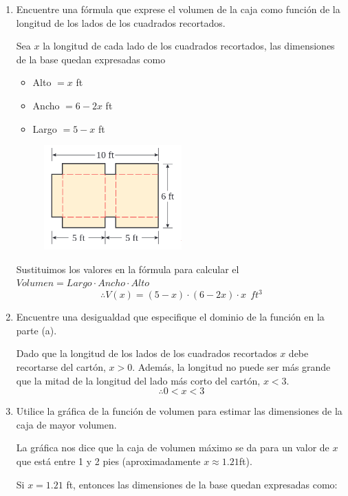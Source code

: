 \documentclass[12pt]{article}
\begin{document}
\begin{enumerate}[label=\alph*)]
\item Encuentre una fórmula que exprese el volumen de la caja como función de la longitud de los lados de los cuadrados recortados.

Sea $x$ la longitud de cada lado de los cuadrados recortados, las dimensiones de la base quedan expresadas como
\begin{itemize}
	\item Alto $=x$ ft
	\item Ancho $=6-2x$ ft
	\item Largo $=5-x$ ft
\end{itemize}

\begin{figure}[h]
	\centering
	\includegraphics[width=0.5\textwidth]{img/prob7.png}
\end{figure}

Sustituimos los valores en la fórmula para calcular el $Volumen = Largo \cdot Ancho \cdot Alto$
\[
\therefore V(x) = (5-x) \cdot (6-2x) \cdot x \ \  ft^3
\]

\item Encuentre una desigualdad que especifique el dominio de la función en la parte (a).

Dado que la longitud de los lados de los cuadrados recortados $x$ debe recortarse del cartón, $x > 0$. Además, la longitud no puede ser más grande que la mitad de la longitud del lado más corto del cartón, $x < 3$.
\[\therefore 0<x<3\]

\item Utilice la gráfica de la función de volumen para estimar las dimensiones de la caja de mayor volumen.

La gráfica nos dice que la caja de volumen máximo se da para un valor de $x$ que está entre 1 y 2 pies (aproximadamente $x \approx 1.21$ft).

Si $x=1.21$ ft, entonces las dimensiones de la base quedan expresadas como:


\end{enumerate}
\end{document}
